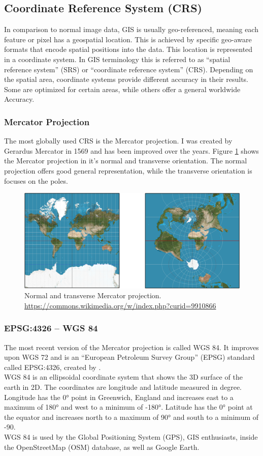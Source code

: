 \subsection{Coordinate Reference System (CRS)}
In comparison to normal image data, GIS is usually geo-referenced, meaning each feature or pixel has a geospatial location. This is achieved by specific geo-aware formats that encode spatial positions into the data. This location is represented in a coordinate system. In GIS terminology this is referred to as \enquote{spatial reference system} (SRS) or \enquote{coordinate reference system} (CRS). Depending on the spatial area, coordinate systems provide different accuracy in their results. Some are optimized for certain areas, while others offer a general worldwide Accuracy.

\subsubsection{Mercator Projection}
The most globally used CRS is the Mercator projection. I was created by Gerardus Mercator in 1569 and has been improved over the years. Figure \ref{fig:mercator} shows the Mercator projection in it's normal and transverse orientation. The normal projection offers good general representation, while the transverse orientation is focuses on the poles.
\begin{figure}[H]
	\centering\includegraphics[width=1\textwidth]{res/Mercator}
	\caption{Normal and transverse Mercator projection. \url{https://commons.wikimedia.org/w/index.php?curid=9910866}}
	\label{fig:mercator}
\end{figure}

\subsubsection{EPSG:4326 -- WGS 84}
The most recent version of the Mercator projection is called WGS 84. It improves upon WGS 72 and is an \enquote{European Petroleum Survey Group} (EPSG) standard called EPSG:4326, created by \cite{Decker1986}.\\
WGS 84 is an ellipsoidal coordinate system that shows the 3D surface of the earth in 2D. The coordinates are longitude and latitude measured in degree. Longitude has the 0° point in Greenwich, England and increases east to a maximum of 180° and west to a minimum of -180°. Latitude has the 0° point at the equator and increases north to a maximum of 90° and south to a minimum of -90.\\
WGS 84 is used by the Global Positioning System (GPS), GIS enthusiasts, inside the OpenStreetMap (OSM) database, as well as Google Earth.

